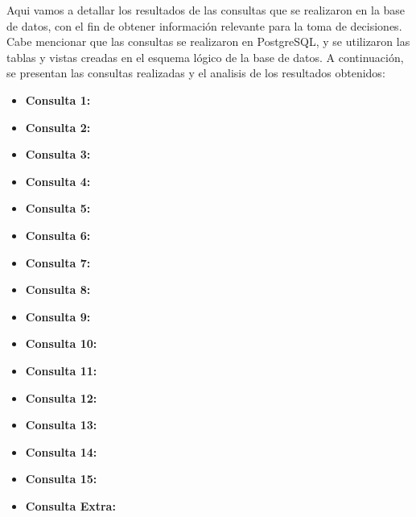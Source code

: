Aqui vamos a detallar los resultados de las consultas que se realizaron en la base de datos, con el fin de obtener información relevante para la toma de decisiones. Cabe mencionar que las consultas se realizaron en PostgreSQL, y se utilizaron las tablas y vistas creadas en el esquema lógico de la base de datos. A continuación, se presentan las consultas realizadas y el analisis de los resultados obtenidos:
\begin{itemize}
    \item \textbf{Consulta 1:} 
    \item \textbf{Consulta 2:} 
    \item  \textbf{Consulta 3:} 
    \item \textbf{Consulta 4:} 
    \item \textbf{Consulta 5:} 
    \item \textbf{Consulta 6:} 
    \item \textbf{Consulta 7:} 
    \item \textbf{Consulta 8:} 
    \item \textbf{Consulta 9:} 
    \item \textbf{Consulta 10:} 
    \item \textbf{Consulta 11:} 
    \item \textbf{Consulta 12:} 
    \item \textbf{Consulta 13:} 
    \item \textbf{Consulta 14:} 
    \item \textbf{Consulta 15:} 
    \item \textbf{Consulta Extra:} 
\end{itemize}